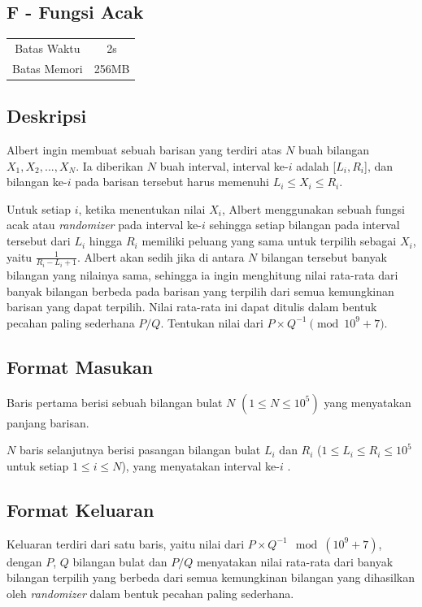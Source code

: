 \documentclass{article}
\begin{document}
\begin{center}
    \section*{F - Fungsi Acak} %

    \begin{tabular}{ | c c | }
        \hline
        Batas Waktu  & 2s \\    %
        Batas Memori & 256MB \\  %
        \hline
    \end{tabular}
\end{center}

\subsection*{Deskripsi}
Albert ingin membuat sebuah barisan yang terdiri atas $N$ buah bilangan $X_1, X_2, ..., X_N$. Ia diberikan $N$ buah interval, interval ke-$i$ adalah [$L_i, R_i$], dan bilangan ke-$i$ pada barisan tersebut harus memenuhi $L_i \leq X_i \leq R_i$.

Untuk setiap $i$, ketika menentukan nilai $X_i$, Albert menggunakan sebuah fungsi acak atau \textit{randomizer} pada interval ke-$i$ sehingga setiap bilangan pada interval tersebut dari $L_i$ hingga $R_i$ memiliki peluang yang sama untuk terpilih sebagai $X_i$, yaitu $\frac{1}{R_i-L_i+1}$. Albert akan sedih jika di antara $N$ bilangan tersebut banyak bilangan yang nilainya sama, sehingga ia ingin menghitung nilai rata-rata dari banyak bilangan berbeda pada barisan yang terpilih dari semua kemungkinan barisan yang dapat terpilih. Nilai rata-rata ini dapat ditulis dalam bentuk pecahan paling sederhana $P/Q$. Tentukan nilai dari $P \times Q^{-1} \pmod {10^{9}+7}$.

\subsection*{Format Masukan}
Baris pertama berisi sebuah bilangan bulat $N$ $(1 \leq N \leq 10^{5})$  yang menyatakan panjang barisan.

$N$ baris selanjutnya berisi pasangan bilangan bulat $L_i$ dan $R_i$ ($1 \leq L_i \leq R_i \leq 10^{5}$ untuk setiap $1 \leq i \leq N$), yang menyatakan interval ke-$i$ . 

\subsection*{Format Keluaran}
Keluaran terdiri dari satu baris, yaitu nilai dari $P \times Q^{-1} \mod (10^{9}+7)$, dengan $P$, $Q$ bilangan bulat dan $P/Q$ menyatakan nilai rata-rata dari banyak bilangan terpilih yang berbeda dari semua kemungkinan bilangan yang dihasilkan oleh \textit{randomizer} dalam bentuk pecahan paling sederhana.
\end{document}
